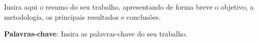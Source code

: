 \begin{resumo}
Insira aqui o resumo do seu trabalho, apresentando de forma breve o objetivo, a metodologia, os principais resultados e conclusões.
 
\vspace{\onelineskip}
\noindent \textbf{Palavras-chave}: Insira as palavras-chave do seu trabalho.
\end{resumo}

